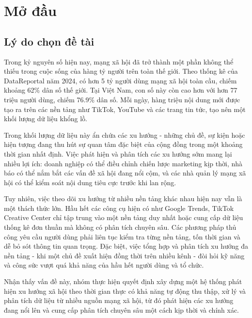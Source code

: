 
\chapter{Mở đầu}


\section{Lý do chọn đề tài}

Trong kỷ nguyên số hiện nay, mạng xã hội đã trở thành một phần không thể thiếu trong cuộc sống của hàng tỷ người trên toàn thế giới. Theo thống kê của DataReportal năm 2024, có hơn 5 tỷ người dùng mạng xã hội toàn cầu, chiếm khoảng 62\% dân số thế giới. Tại Việt Nam, con số này còn cao hơn với hơn 77 triệu người dùng, chiếm 76.9\% dân số. Mỗi ngày, hàng triệu nội dung mới được tạo ra trên các nền tảng như TikTok, YouTube và các trang tin tức, tạo nên một khối lượng dữ liệu khổng lồ.

Trong khối lượng dữ liệu này ẩn chứa các xu hướng - những chủ đề, sự kiện hoặc hiện tượng đang thu hút sự quan tâm đặc biệt của cộng đồng trong một khoảng thời gian nhất định. Việc phát hiện và phân tích các xu hướng sớm mang lại nhiều lợi ích: doanh nghiệp có thể điều chỉnh chiến lược marketing kịp thời, nhà báo có thể nắm bắt các vấn đề xã hội đang nổi cộm, và các nhà quản lý mạng xã hội có thể kiểm soát nội dung tiêu cực trước khi lan rộng.

Tuy nhiên, việc theo dõi xu hướng từ nhiều nền tảng khác nhau hiện nay vẫn là một thách thức lớn. Hầu hết các công cụ hiện có như Google Trends, TikTok Creative Center chỉ tập trung vào một nền tảng duy nhất hoặc cung cấp dữ liệu thống kê đơn thuần mà không có phân tích chuyên sâu. Các phương pháp thủ công yêu cầu người dùng phải liên tục kiểm tra từng nền tảng, tốn thời gian và dễ bỏ sót thông tin quan trọng. Đặc biệt, việc tổng hợp và phân tích xu hướng đa nền tảng - khi một chủ đề xuất hiện đồng thời trên nhiều kênh - đòi hỏi kỹ năng và công sức vượt quá khả năng của hầu hết người dùng và tổ chức.

Nhận thấy vấn đề này, nhóm thực hiện quyết định xây dựng một hệ thống phát hiện xu hướng xã hội theo thời gian thực có khả năng tự động thu thập, xử lý và phân tích dữ liệu từ nhiều nguồn mạng xã hội, từ đó phát hiện các xu hướng đang nổi lên và cung cấp phân tích chuyên sâu một cách kịp thời và chính xác.

